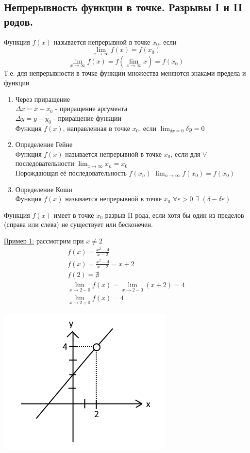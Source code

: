 \documentclass[12pt]{article}
\begin{document}
    \subsection{Непрерывность функции в точке. Разрывы I и II родов.}
    \noindent Функция $f(x)$ называется непрерывной в точке $x_0$, если 
    \[\lim_{x\to\infty}f(x) = f(x_0)\]
    \[\lim_{x\to\infty}f(x) = f(\lim_{x\to\infty}x) = f(x_0)\]
    \noindent Т.е. для непрерывности в точке функции множества меняются знаками предела и функции
    \begin{enumerate}
        \item Через приращение\\
        $\varDelta x = x - x_0$ - приращение аргумента\\
        $\varDelta y = y - y_0$ - приращение функции\\
        Функция $f(x)$, направленная в точке $x_0$, если $\lim_{\delta x = 0} \delta y = 0$
        \item Определение Гейне\\
        Функция $f(x)$ называется непрерывной в точке $x_0$, если для $\forall$ последовательности $\lim_{x\to\infty} x_n = x_0$\\
        Порождающая её последовательность $f(x_n)$ $\lim_{n\to\infty} f(x_0) = f(x_0)$
        \item Определение Коши\\
        Функция $f(x)$ называется непрерывной в точке $x_0$ $\forall \varepsilon > 0$ $\exists$ $(\delta - \delta \varepsilon)$
    \end{enumerate}
    Функция $f(x)$ имеет в точке $x_0$ разрыв II рода, если хотя бы один из пределов (справа или слева) не существует или бесконечен.\par\noindent
    \underline{Пример 1:} рассмотрим при $x \ne 2$
    \begin{gather*}
        f(x) = \frac{x^2 - 4}{x-2}\\
        f(x) = \frac{x^2-4}{x-2} = x+2\\
        f(2) = \nexists\\
        \lim_{x\to 2-0} f(x) = \lim_{x\to 2-0}(x+2) = 4\\
        \lim_{x\to 2+0} f(x) = 4
    \end{gather*}
    \begin{center}
        \includegraphics{3.4.2}
    \end{center}
\end{document}
